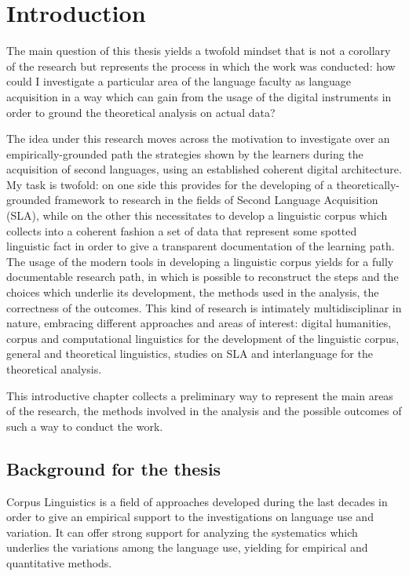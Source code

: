 \documentclass[a4paper,twoside,12pt,chapterprefix=false,bibliography=totocnumbered,listof=flat]{scrbook}
\begin{document}
\mainmatter

\chapter{Introduction}\label{introduction}

The main question of this thesis yields a twofold mindset that is not a
corollary of the research but represents the process in which the work
was conducted: how could I investigate a particular area of the language
faculty as language acquisition in a way which can gain from the usage
of the digital instruments in order to ground the theoretical analysis
on actual data?

The idea under this research moves across the motivation to investigate
over an empirically-grounded path the strategies shown by the learners
during the acquisition of second languages, using an established
coherent digital architecture. My task is twofold: on one side this
provides for the developing of a theoretically-grounded framework to
research in the fields of Second Language Acquisition (SLA), while on
the other this necessitates to develop a linguistic corpus which
collects into a coherent fashion a set of data that represent some
spotted linguistic fact in order to give a transparent documentation of
the learning path. The usage of the modern tools in developing a
linguistic corpus yields for a fully documentable research path, in
which is possible to reconstruct the steps and the choices which
underlie its development, the methods used in the analysis, the
correctness of the outcomes. This kind of research is intimately
multidisciplinar in nature, embracing different approaches and areas of
interest: digital humanities, corpus and computational linguistics for
the development of the linguistic corpus, general and theoretical
linguistics, studies on SLA and interlanguage for the theoretical
analysis.

This introductive chapter collects a preliminary way to represent the
main areas of the research, the methods involved in the analysis and the
possible outcomes of such a way to conduct the work.

\section{Background for the thesis}\label{background-for-the-thesis}

Corpus Linguistics is a field of approaches developed during the last
decades in order to give an empirical support to the investigations on
language use and variation. It can offer strong support for analyzing
the systematics which underlies the variations among the language use,
yielding for empirical and quantitative methods.
\end{document}
